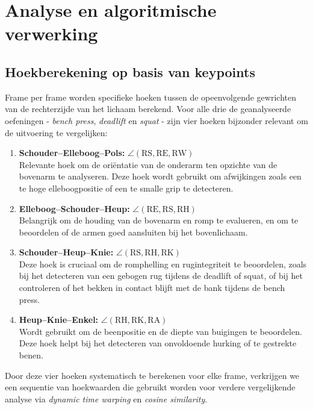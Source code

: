 \chapter{Analyse en algoritmische verwerking}
\label{ch:algoritme}

\section{Hoekberekening op basis van keypoints}
Frame per frame worden specifieke hoeken tussen de opeenvolgende gewrichten van de rechterzijde van het lichaam berekend.
Voor alle drie de geanalyseerde oefeningen - \textit{bench press}, \textit{deadlift} en \textit{squat} - zijn vier hoeken bijzonder relevant om de uitvoering te vergelijken:

\begin{enumerate}
    \item \textbf{Schouder–Elleboog–Pols:} $\angle(\text{RS}, \text{RE}, \text{RW})$ \\
    Relevante hoek om de oriëntatie van de onderarm ten opzichte van de bovenarm te analyseren. Deze hoek wordt gebruikt om afwijkingen zoals een te hoge elleboogpositie of een te smalle grip te detecteren.
    
    \item \textbf{Elleboog–Schouder–Heup:} $\angle(\text{RE}, \text{RS}, \text{RH})$ \\
    Belangrijk om de houding van de bovenarm en romp te evalueren, en om te beoordelen of de armen goed aansluiten bij het bovenlichaam.

    \item \textbf{Schouder–Heup–Knie:} $\angle(\text{RS}, \text{RH}, \text{RK})$ \\
    Deze hoek is cruciaal om de romphelling en rugintegriteit te beoordelen, zoals bij het detecteren van een gebogen rug tijdens de deadlift of squat, of bij het controleren of het bekken in contact blijft met de bank tijdens de bench press.

    \item \textbf{Heup–Knie–Enkel:} $\angle(\text{RH}, \text{RK}, \text{RA})$ \\
    Wordt gebruikt om de beenpositie en de diepte van buigingen te beoordelen. Deze hoek helpt bij het detecteren van onvoldoende hurking of te gestrekte benen.
\end{enumerate}

Door deze vier hoeken systematisch te berekenen voor elke frame, verkrijgen we een sequentie van hoekwaarden die gebruikt worden voor verdere vergelijkende analyse via \textit{dynamic time warping} en \textit{cosine similarity}.

